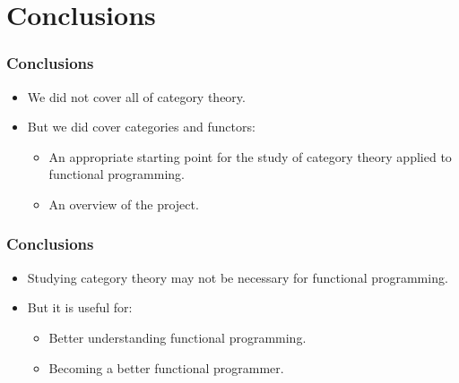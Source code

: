 \documentclass{beamer}
\begin{document}
\section{Conclusions}


\begin{frame}
  \frametitle{Conclusions}

  \begin{itemize}
  \item
    We did not cover all of category theory.
  \end{itemize}
  \begin{itemize}
  \item
    But we did cover categories and functors:
    \begin{itemize}
    \item
      An appropriate starting point for the study of category theory
      applied to functional programming.
    \item
      An overview of the project.
    \end{itemize}
  \end{itemize}

\end{frame}


\begin{frame}
  \frametitle{Conclusions}

  \begin{itemize}
  \item
    Studying category theory may not be necessary for functional
    programming.
  \end{itemize}
  \begin{itemize}
  \item
    But it is useful for:
    \begin{itemize}
    \item
      Better understanding functional programming.
    \item
      Becoming a better functional programmer.
    \end{itemize}
  \end{itemize}

\end{frame}

\end{document}
